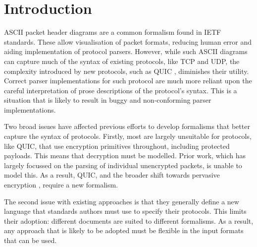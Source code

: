 \documentclass[10pt,sigconf]{acmart}
\begin{document}
\section{Introduction}

%

ASCII packet header diagrams are a common formalism found in IETF standards.
These allow visualisation of packet formats, reducing human error
and aiding implementation of protocol parsers. However, while such ASCII diagrams can
capture much of the syntax of existing protocols, like TCP and UDP, the complexity
introduced by new protocols, such as QUIC \cite{draft-ietf-quic-transport-latest},
diminishes their utility. Correct parser implementations for such protocol are much more
reliant upon the careful interpretation of prose descriptions of the protocol's syntax.
This is a situation that is likely to result in buggy and non-conforming parser implementations.


Two broad issues have affected previous efforts to develop formalisms that better capture
the syntax of protocols. Firstly, most are largely unsuitable for protocols, like QUIC,
that use encryption primitives throughout, including protected payloads. This means that
decryption must be modelled. Prior work, which has largely focussed on the parsing of
individual unencrypted packets, is unable to model this. As a result, QUIC, and the broader
shift towards pervasive encryption \cite{rfc7258}, require a new formalism.

The second issue with existing approaches is that they generally define a new language
that standards authors must use to specify their protocols. This limits their adoption:
different documents are suited to different formalisms. As a result,
any approach that is likely to be adopted must be flexible in the input formats that can
be used.
\end{document}
